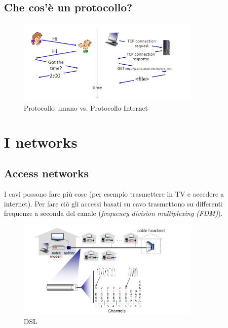\subsection{Che cos'è un protocollo?}



\begin{figure}[h]
\caption{Protocollo umano vs. Protocollo Internet}
\centering
\includegraphics[width=0.8\textwidth]{images/Intro/Protocolli.png}
\end{figure}
\pagebreak
\section{I networks}

\subsection{Access networks}

I cavi possono fare più cose (per esempio trasmettere in TV e accedere a internet). Per fare ciò gli accessi basati su cavo trasmettono su differenti frequenze a seconda del canale (\textit{frequency division multiplexing (FDM)}).

\begin{figure}[h]
\caption{DSL}
\centering
\includegraphics[width=0.8\textwidth]{images/Intro/FDM.png}
\end{figure}

